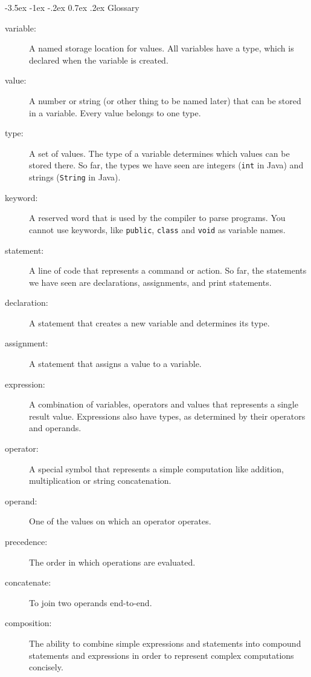\documentclass{book}
\makeatletter
\renewcommand{\section}{\@startsection 
    {section} {1} {0mm}%
    {-3.5ex \@plus -1ex \@minus -.2ex}%
    {0.7ex \@plus.2ex}%
    {\normalfont\Large\bfseries}}
\makeatother
\begin{document}
\section{Glossary}

\begin{description}

\item[variable:] A named storage location for values.  All
variables have a type, which is declared when the variable
is created.

\item[value:] A number or string (or other thing to be named later)
that can be stored in a variable.  Every value belongs to
one type.

\item[type:] A set of values.  The type of a variable
determines which values can be stored there.  So far, the types
we have seen are integers ({\tt int} in Java) and strings
({\tt String} in Java).

\item[keyword:]  A reserved word that is used by the compiler
to parse programs.  You cannot use keywords, like {\tt public},
{\tt class} and {\tt void} as variable names.

\item[statement:] A line of code that represents a command or
action.  So far, the statements we have seen are declarations,
assignments, and print statements.

\item[declaration:] A statement that creates a new variable and
determines its type.

\item[assignment:] A statement that assigns a value to a variable.

\item[expression:] A combination of variables, operators and
values that represents a single result value.  Expressions also
have types, as determined by their operators and operands.

\item[operator:] A special symbol that represents a simple
computation like addition, multiplication or string
concatenation.

\item[operand:] One of the values on which an operator operates. 

\item[precedence:] The order in which operations are evaluated.

\item[concatenate:] To join two operands end-to-end.

\item[composition:] The ability to combine simple
expressions and statements into compound statements and expressions
in order to represent complex computations concisely.


\end{description}
\end{document}
